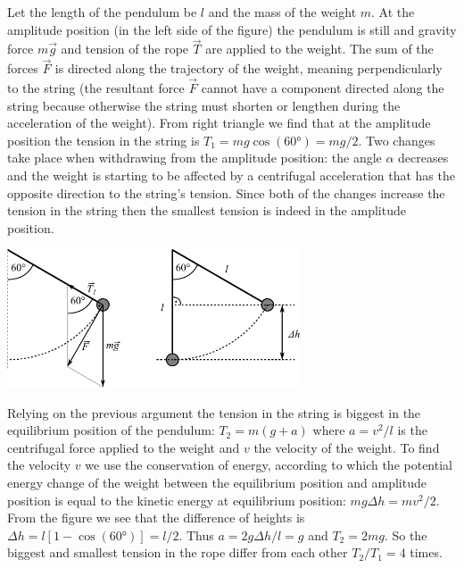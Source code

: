 \documentclass[11pt]{article}
\begin{document}
\solueng
Let the length of the pendulum be $l$ and the mass of the weight $m$. At the amplitude position (in the left side of the figure) the pendulum is still and gravity force $m\vec{g}$ and tension of the rope $\vec{T}$ are applied to the weight. The sum of the forces $\vec{F}$ is directed along the trajectory of the weight, meaning perpendicularly to the string (the resultant force $\vec{F}$ cannot have a component directed along the string because otherwise the string must shorten or lengthen during the acceleration of the weight). From right triangle we find that at the amplitude position the tension in the string is $T_1 = mg\cos(\ang{60}) = mg / 2$. Two changes take place when withdrawing from the amplitude position: the angle $\alpha$ decreases and the weight is starting to be affected by a centrifugal acceleration that has the opposite direction to the string’s tension. Since both of the changes increase the tension in the string then the smallest tension is indeed in the amplitude position.
\begin{center}
	\vspace{-10pt}
	\includegraphics[width=0.65\textwidth]{2017-v2g-03-pendel-joonis}
	\vspace{-15pt}
\end{center}
Relying on the previous argument the tension in the string is biggest in the equilibrium position of the pendulum: $T_2 = m(g + a)$ where $a = v^2 / l$ is the centrifugal force applied to the weight and $v$ the velocity of the weight. To find the velocity $v$ we use the conservation of energy, according to which the potential energy change of the weight between the equilibrium position and amplitude position is equal to the kinetic energy at equilibrium position: $mg\Delta h = mv^2 / 2$. From the figure we see that the difference of heights is $\Delta h = l[1-\cos(\ang{60})] = l / 2$. Thus $a = 2g\Delta h / l = g$ and $T_2 = 2mg$. So the biggest and smallest tension in the rope differ from each other $T_2 / T_1 = 4$ times.
\probend
\bigskip

\end{document}
